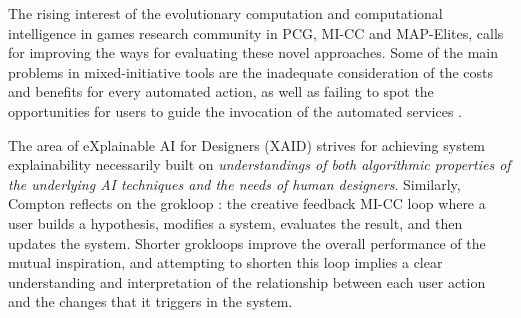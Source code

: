 The rising interest of the evolutionary computation and computational intelligence in games research community in PCG, MI-CC and MAP-Elites, %
calls for improving the ways for evaluating these novel approaches. Some of the main problems in mixed-initiative tools are the inadequate consideration of the costs and benefits for every automated action, as well as failing to spot the opportunities for users to guide the invocation of the automated services . 

The area of eXplainable AI for Designers (XAID)  strives for achieving system explainability necessarily built on \textit{understandings of both algorithmic properties of the underlying AI techniques and the needs of human designers}. Similarly, Compton reflects on the grokloop : the creative feedback MI-CC loop where a user builds a hypothesis, modifies a system, evaluates the result, and then updates the system. Shorter grokloops improve the overall performance of the mutual inspiration, and attempting to shorten this loop implies a clear understanding and interpretation of the relationship between each user action and the changes that it triggers in the system.

